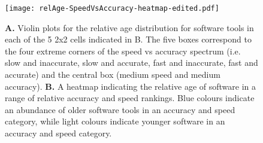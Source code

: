 \documentclass[fleqn,10pt]{SelfArx} %
\begin{document}
\begin{figure}[H]
\centering
\texttt{[image: relAge-SpeedVsAccuracy-heatmap-edited.pdf]}
\caption{{\bf A.} Violin plots for the relative age distribution for software tools in each of the 5 2x2 cells indicated in B. The five boxes correspond to the four extreme corners of the speed vs accuracy spectrum (i.e. slow and inaccurate, slow and accurate, fast and inaccurate, fast and accurate) and the central box (medium speed and medium accuracy). {\bf B.} A heatmap indicating the relative age of software in a range of relative accuracy and speed rankings. Blue colours indicate an abundance of older software tools in an accuracy and speed category, while light colours indicate younger software in an accuracy and speed category. }
\label{fig:ageplot}
\end{figure}




\end{document}
